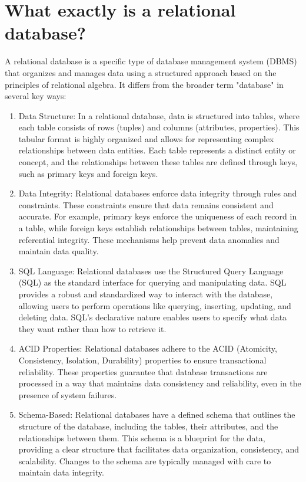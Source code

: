 \section{What exactly is a relational database?}
A relational database is a specific type of database management system (DBMS) that organizes and manages data using a structured approach based on the principles of relational algebra. It differs from the broader term "database" in several key ways:

\begin{enumerate}
    \item Data Structure: In a relational database, data is structured into tables, where each table consists of rows (tuples) and columns (attributes, properties). This tabular format is highly organized and allows for representing complex relationships between data entities. Each table represents a distinct entity or concept, and the relationships between these tables are defined through keys, such as primary keys and foreign keys.
    \item Data Integrity: Relational databases enforce data integrity through rules and constraints. These constraints ensure that data remains consistent and accurate. For example, primary keys enforce the uniqueness of each record in a table, while foreign keys establish relationships between tables, maintaining referential integrity. These mechanisms help prevent data anomalies and maintain data quality.
    \item SQL Language: Relational databases use the Structured Query Language (SQL) as the standard interface for querying and manipulating data. SQL provides a robust and standardized way to interact with the database, allowing users to perform operations like querying, inserting, updating, and deleting data. SQL's declarative nature enables users to specify what data they want rather than how to retrieve it.
    \item ACID Properties: Relational databases adhere to the ACID (Atomicity, Consistency, Isolation, Durability) properties to ensure transactional reliability. These properties guarantee that database transactions are processed in a way that maintains data consistency and reliability, even in the presence of system failures.
    \item Schema-Based: Relational databases have a defined schema that outlines the structure of the database, including the tables, their attributes, and the relationships between them. This schema is a blueprint for the data, providing a clear structure that facilitates data organization, consistency, and scalability. Changes to the schema are typically managed with care to maintain data integrity.
\end{enumerate}

